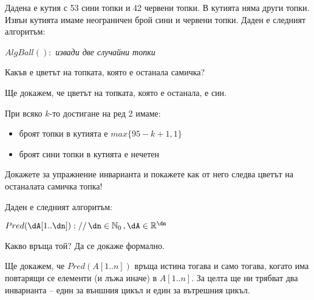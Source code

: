 \begin{problem}\label{prob-balls-in-box}
	Дадена е кутия с 53 сини топки и 42 червени топки. В кутията няма други топки. Извън кутията имаме неограничен брой сини и червени топки. Даден е следният алгоритъм:
	
	\begin{pseudocode}
		
		$AlgBall():$
		\Mybegin
		{
			{
				\emph{извади две случайни топки}\;
			}
		}
	\end{pseudocode}
	Какъв е цветът на топката, която е останала самичка?
\end{problem}

\begin{solution}
	Ще докажем, че цветът на топката, която е останала, е син.
\end{solution}

\begin{boxinvariant*}{}{}
	При всяко $k$-то достигане на ред 2 имаме:
	\begin{itemize}
		\item броят топки в кутията е $max\{95-k+1,1\}$
		\item броят сини топки в кутията е нечетен
	\end{itemize}
\end{boxinvariant*}\leavevmode\newline
Докажете за упражнение инварианта и покажете как от него следва цветът на останалата самичка топка!\\

\begin{problem}\label{prob-2-1}
	Даден е следният алгоритъм:
	\begin{pseudocode}
		\SetKwData{dA}{A}
		\SetKwData{dn}{n}
		\SetKwData{dj}{j}
		\SetKwData{di}{i}
		
		$Pred(\dA[1..\dn])://\,\dn\in\mathbb{N}_0\,,\dA\in\mathbb{R}^{\dn}$
		\Mybegin
		{
			\Myfor{$\di\leftarrow1$ \KwTo $\dn-1$}
			{
				\Myfor{$\dj\leftarrow\di+1$ \KwTo $\dn$}
				{
					\If{$\dA[\di]=\dA[\dj]$}{\KwRet{\True\;}}
				}
			}
			\KwRet{\False\;}
		}
	\end{pseudocode}
	Какво връща той? Да се докаже формално.
\end{problem}

\begin{solution}
	Ще докажем, че $Pred(A[1..n])$ връща истина тогава и само тогава, когато има повтарящи се елементи (и лъжа иначе) в $A[1..n]$. За целта ще ни трябват два инварианта -- един за външния цикъл и един за вътрешния цикъл.
\end{solution}

